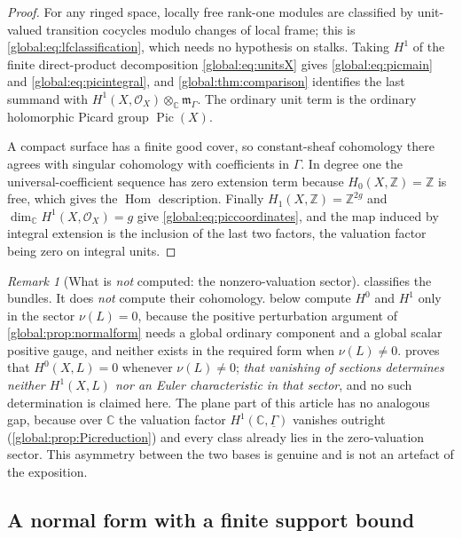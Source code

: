 \documentclass[11pt,letterpaper]{article}
\theoremstyle{definition}
\theoremstyle{remark}
\newtheorem{remark}[remark]{Remark}
\newcommand{\C}{\mathbb C}
\newcommand{\Z}{\mathbb Z}
\newcommand{\OO}{\mathcal O}
\newcommand{\mK}{\mathfrak m_\Gamma}
\newcommand{\Pic}{\operatorname{Pic}}
\newcommand{\Hom}{\operatorname{Hom}}
\numberwithin{equation}{section}
\begin{document}
\begin{proof}
For any ringed space, locally free rank-one modules are classified by unit-valued transition cocycles modulo changes of local frame; this is \eqref{global:eq:lfclassification}, which needs no hypothesis on stalks. Taking $H^1$ of the finite direct-product decomposition \eqref{global:eq:unitsX} gives \eqref{global:eq:picmain} and \eqref{global:eq:picintegral}, and \cref{global:thm:comparison} identifies the last summand with $H^1(X,\OO_X)\otimes_\C\mK$. The ordinary unit term is the ordinary holomorphic Picard group $\Pic(X)$.

A compact surface has a finite good cover, so constant-sheaf cohomology there agrees with singular cohomology with coefficients in $\Gamma$. In degree one the universal-coefficient sequence has zero extension term because $H_0(X,\Z)=\Z$ is free, which gives the $\Hom$ description. Finally $H_1(X,\Z)=\Z^{2g}$ and $\dim_\C H^1(X,\OO_X)=g$ give \eqref{global:eq:piccoordinates}, and the map induced by integral extension is the inclusion of the last two factors, the valuation factor being zero on integral units.
\end{proof}

\begin{remark}[What is \emph{not} computed: the nonzero-valuation sector]\label{global:rem:nonzerovaluation}
 classifies the bundles. It does \emph{not} compute their cohomology.  below compute $H^0$ and $H^1$ only in the sector $\nu(L)=0$, because the positive perturbation argument of \cref{global:prop:normalform} needs a global ordinary component and a global scalar positive gauge, and neither exists in the required form when $\nu(L)\ne0$.  proves that $H^0(X,L)=0$ whenever $\nu(L)\ne0$; \emph{that vanishing of sections determines neither $H^1(X,L)$ nor an Euler characteristic in that sector}, and no such determination is claimed here. The plane part of this article has no analogous gap, because over $\C$ the valuation factor $H^1(\C,\underline\Gamma)$ vanishes outright (\cref{global:prop:Picreduction}) and every class already lies in the zero-valuation sector. This asymmetry between the two bases is genuine and is not an artefact of the exposition.
\end{remark}

\subsection{A normal form with a finite support bound}\label{global:sub:normalcocycle}
\end{document}
